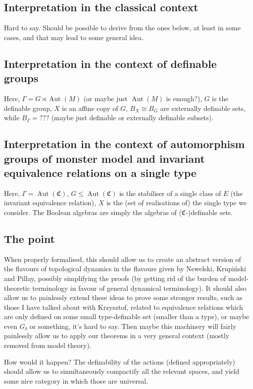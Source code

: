 \documentclass[final,a4paper,12pt]{amsart}
\newcommand{\fC}{{\mathfrak C}}
\DeclareMathOperator{\Aut}{{Aut}}
\theoremstyle{remark}
\theoremstyle{definition}
\let\Gamma\varGamma
\begin{document}
	\subsection{Interpretation in the classical context}
	Hard to say. Should be possible to derive from the ones below, at least in some cases, and that may lead to some general idea.
	
	\subsection{Interpretation in the context of definable groups}
	Here, $\Gamma=G\rtimes \Aut(M)$ (or maybe just $\Aut(M)$ is enough?), $G$ is the definable group, $X$ is an affine copy of $G$, $B_X\cong B_G$ are externally definable sets, while $B_\Gamma=???$ (maybe just definable or externally definable subsets).
	
	\subsection{Interpretation in the context of automorphism groups of monster model and invariant equivalence relations on a single type}	
	Here, $\Gamma=\Aut(\fC)$, $G\leq \Aut(\fC)$ is the stabiliser of a single class of $E$ (the invariant equivalence relation), $X$ is the (set of realisations of) the single type we consider. The Boolean algebras are simply the algebras of ($\fC$-)definable sets.
	
	\subsection{The point}
	When properly formalised, this should allow us to create an abstract version of the flavours of topological dynamics in the flavours given by Newelski, Krupiński and Pillay, possibly simplifying the proofs (by getting rid of the burden of model-theoretic terminology in favour of general dynamical terminology). It should also allow us to painlessly extend these ideas to prove some stronger results, such as those I have talked about with Krzysztof, related to equivalence relations which are only defined on some small type-definable set (smaller than a type), or maybe even $G_\delta$ or something, it's hard to say. Then maybe this machinery will fairly painlessly allow us to apply our theorems in a very general context (mostly removed from model theory).
	
	How would it happen? The definability of the actions (defined appropriately) should allow us to simultaneously compactify all the relevant spaces, and yield some nice category in which those are universal.
	
\end{document}
